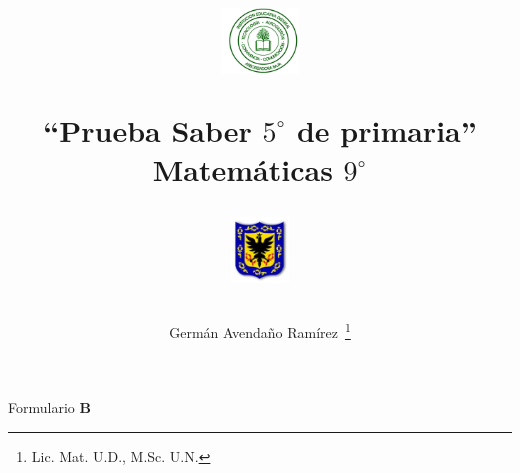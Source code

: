\documentclass[10pt,addpoints]{exam}
\begin{document}
\title{\begin{minipage}{.2\textwidth}
        \includegraphics[height=1.75cm]{Images/logo-colegio.png}
       \end{minipage}
\begin{minipage}{.55\textwidth}
 \begin{center}
``Prueba Saber $5^{\circ}$ de primaria''\\Matemáticas $9^{\circ}$
\end{center}
\end{minipage}
\begin{minipage}{.2\textwidth}
\includegraphics[height=1.75cm]{Images/logo-sed.png} 
\end{minipage}
}
\author{Germ\'{a}n Avendaño Ram\'{i}rez~\thanks{Lic. Mat. U.D., M.Sc. U.N.}}
\date{}
\maketitle
\begin{center}
\end{center}
Formulario \textbf{B}
\end{document}
